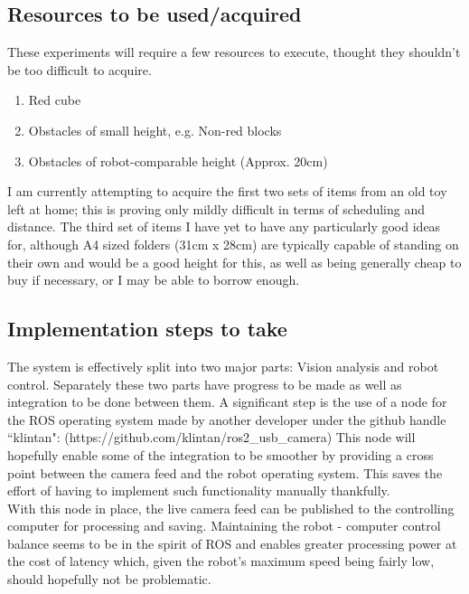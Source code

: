 \documentclass[10pt,a4paper]{report}
\begin{document}
	\subsection*{Resources to be used/acquired}
		These experiments will require a few resources to execute, thought they shouldn't be too difficult to acquire. 
		\begin{enumerate}
			\item Red cube
			\item Obstacles of small height, e.g. Non-red blocks
			\item Obstacles of robot-comparable height (Approx. 20cm)
		\end{enumerate}
		I am currently attempting to acquire the first two sets of items from an old toy left at home; this is proving only mildly difficult in terms of scheduling and distance. The third set of items I have yet to have any particularly good ideas for, although A4 sized folders (31cm x 28cm) are typically capable of standing on their own and would be a good height for this, as well as being generally cheap to buy if necessary, or I may be able to borrow enough.
		
	\subsection*{Implementation steps to take}
		The system is effectively split into two major parts: Vision analysis and robot control. Separately these two parts have progress to be made as well as integration to be done between them. A significant step is the use of a node for the ROS operating system made by another developer under the github handle ``klintan": (https://github.com/klintan/ros2\_usb\_camera) This node will hopefully enable some of the integration to be smoother by providing a cross point between the camera feed and the robot operating system. This saves the effort of having to implement such functionality manually thankfully. \\
		With this node in place, the live camera feed can be published to the controlling computer for processing and saving. Maintaining the robot - computer control balance seems to be in the spirit of ROS and enables greater processing power at the cost of latency which, given the robot’s maximum speed being fairly low, should hopefully not be problematic.
\end{document}
